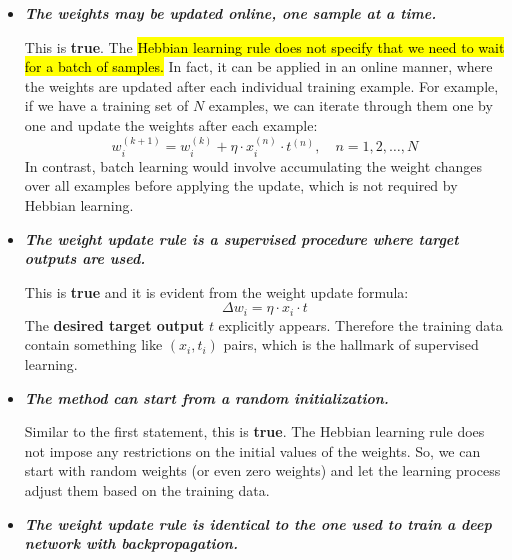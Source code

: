 \begin{itemize}
    \item[\textcolor{Green3}{\faIcon{check}}] \textcolor{Green3}{\textbf{\emph{The weights may be updated online, one sample at a time.}}}

        This is \textbf{true}. The \hl{Hebbian learning rule does not specify that we need to wait for a batch of samples.} In fact, it can be applied in an online manner, where the weights are updated after each individual training example. For example, if we have a training set of $N$ examples, we can iterate through them one by one and update the weights after each example:
        \begin{equation*}
            w_{i}^{(k+1)} = w_i^{(k)} + \eta \cdot x_i^{(n)} \cdot t^{(n)}, \quad n = 1, 2, \ldots, N
        \end{equation*}
        In contrast, batch learning would involve accumulating the weight changes over all examples before applying the update, which is not required by Hebbian learning.

    \item[\textcolor{Green3}{\faIcon{check}}] \textcolor{Green3}{\textbf{\emph{The weight update rule is a supervised procedure where target outputs are used.}}}

        This is \textbf{true} and it is evident from the weight update formula:
        \begin{equation*}
            \Delta w_i = \eta \cdot x_i \cdot \boxed{t}
        \end{equation*}
        The \textbf{desired target output} $t$ explicitly appears. Therefore the training data contain something like $(x_i, t_i)$ pairs, which is the hallmark of supervised learning.

    \item[\textcolor{Green3}{\faIcon{check}}] \textcolor{Green3}{\textbf{\emph{The method can start from a random initialization.}}}

        Similar to the first statement, this is \textbf{true}. The Hebbian learning rule does not impose any restrictions on the initial values of the weights. So, we can start with random weights (or even zero weights) and let the learning process adjust them based on the training data.

    \item[\textcolor{Red2}{\faIcon{times}}] \textcolor{Red2}{\textbf{\emph{The weight update rule is identical to the one used to train a deep network with backpropagation.}}}


\end{itemize}
